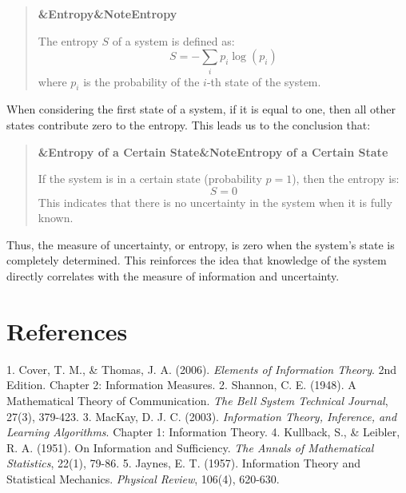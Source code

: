 \documentclass[a4paper]{article}
\newcommand{\boxheading}[1]{%
  \par\smallskip
  \noindent\textbf{\ifx&#1&Note\else#1\fi}\par
  \smallskip
}
\newenvironment{thmbox}[1][]{%
  \begin{quote}\color{blue!60!black}\boxheading{#1}\normalcolor
}{\end{quote}}
\newenvironment{defbox}[1][]{%
  \begin{quote}\color{green!40!black}\boxheading{#1}\normalcolor
}{\end{quote}}
\begin{document}
\begin{defbox}[Entropy]
The entropy \( S \) of a system is defined as:
\begin{equation}
S = -\sum_{i} p_i \log(p_i)
\end{equation}
where \( p_i \) is the probability of the \( i \)-th state of the system.
\end{defbox}

When considering the first state of a system, if it is equal to one, then all other states contribute zero to the entropy. This leads us to the conclusion that:

\begin{thmbox}[Entropy of a Certain State]
If the system is in a certain state (probability \( p = 1 \)), then the entropy is:
\begin{equation}
S = 0
\end{equation}
This indicates that there is no uncertainty in the system when it is fully known.
\end{thmbox}

Thus, the measure of uncertainty, or entropy, is zero when the system's state is completely determined. This reinforces the idea that knowledge of the system directly correlates with the measure of information and uncertainty.

\section{References}
1. Cover, T. M., \& Thomas, J. A. (2006). \textit{Elements of Information Theory}. 2nd Edition. Chapter 2: Information Measures.
2. Shannon, C. E. (1948). A Mathematical Theory of Communication. \textit{The Bell System Technical Journal}, 27(3), 379-423.
3. MacKay, D. J. C. (2003). \textit{Information Theory, Inference, and Learning Algorithms}. Chapter 1: Information Theory.
4. Kullback, S., \& Leibler, R. A. (1951). On Information and Sufficiency. \textit{The Annals of Mathematical Statistics}, 22(1), 79-86.
5. Jaynes, E. T. (1957). Information Theory and Statistical Mechanics. \textit{Physical Review}, 106(4), 620-630.
\end{document}
